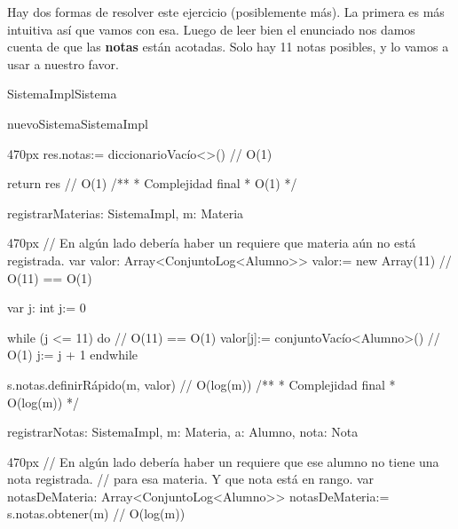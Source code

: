 \documentclass[10pt,a4paper]{article}
\begin{document}
Hay dos formas de resolver este ejercicio (posiblemente más). La primera es más intuitiva así que vamos con esa.
Luego de leer bien el enunciado nos damos cuenta de que las \textbf{notas} están acotadas. Solo hay 11 notas posibles, y lo vamos a usar a nuestro favor.


\vspace{1em}
\vspace{1em}
\begin{ModuloImplements}{SistemaImpl}{Sistema}
  \begin{Vars}
  \end{Vars}

  \begin{proc}{nuevoSistema}{}{SistemaImpl}
    \begin{ImplementationCode}{470px}
      res.notas:= diccionarioVacío<>() // O(1)

      return res // O(1)
      /**
      * Complejidad final
      * O(1)
      */
    \end{ImplementationCode}
  \end{proc}

  \begin{proc}{registrarMateria}{\Inout s: SistemaImpl, \In m: Materia}{}
    \begin{ImplementationCode}{470px}
      // En algún lado debería haber un requiere que materia aún no está registrada.
      var valor: Array<ConjuntoLog<Alumno>>
          valor:= new Array(11) // O(11) == O(1)
      
      var j: int
          j:= 0
      
      while (j <= 11) do // O(11) == O(1)
        valor[j]:= conjuntoVacío<Alumno>() // O(1)
        j:= j + 1
      endwhile
      
      s.notas.definirRápido(m, valor) // O(log(m))
      /**
       * Complejidad final
       * O(log(m))
       */
    \end{ImplementationCode}
  \end{proc}

  \begin{proc}{registrarNota}{\Inout s: SistemaImpl, \In m: Materia, \In a: Alumno, \In nota: Nota}{}
    \begin{ImplementationCode}{470px}
      // En algún lado debería haber un requiere que ese alumno no tiene una nota registrada.
      // para esa materia. Y que nota está en rango.
      var notasDeMateria: Array<ConjuntoLog<Alumno>>
          notasDeMateria:= s.notas.obtener(m) // O(log(m))
      

\end{ImplementationCode}
\end{proc}
\end{ModuloImplements}
\end{document}
